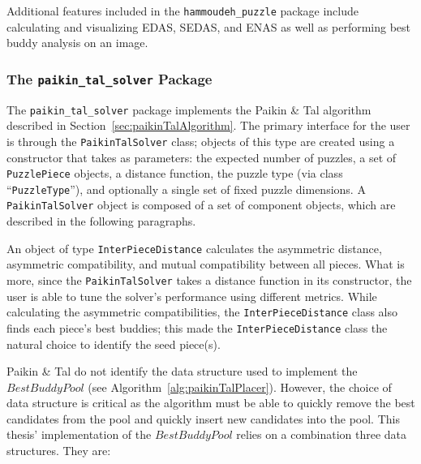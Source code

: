 \documentclass{report}
\newcommand{\hammoudehPuzzlePackage}{\texttt{hammoudeh\_puzzle} }
\newcommand{\paikinTalPackage}{\texttt{paikin\_tal\_solver} }
\begin{document}
Additional features included in the \hammoudehPuzzlePackage package include calculating and visualizing EDAS, SEDAS, and ENAS as well as performing best buddy analysis on an image.

\subsubsection{The \paikinTalPackage Package}\label{sec:paikinTalSolverPackage}

The \paikinTalPackage package implements the Paikin \& Tal algorithm described in Section~\ref{sec:paikinTalAlgorithm}.  The primary interface for the user is through the \texttt{PaikinTalSolver} class; objects of this type are created using a constructor that takes as parameters: the expected number of puzzles, a set of \texttt{PuzzlePiece} objects, a distance function, the puzzle type (via class ``\texttt{PuzzleType}''), and optionally a single set of fixed puzzle dimensions.  A \texttt{PaikinTalSolver} object is composed of a set of component objects, which are described in the following paragraphs.

An object of type \texttt{InterPieceDistance} calculates the asymmetric distance, asymmetric compatibility, and mutual compatibility between all pieces.  What is more, since the \texttt{PaikinTalSolver} takes a distance function in its constructor, the user is able to tune the solver's performance using different metrics.  While calculating the asymmetric compatibilities, the \texttt{InterPieceDistance} class also finds each piece's best buddies; this made the \texttt{InterPieceDistance} class the natural choice to identify the seed piece(s).

Paikin \& Tal do not identify the data structure used to implement the $BestBuddyPool$ (see Algorithm~\ref{alg:paikinTalPlacer}). However, the choice of data structure is critical as the algorithm must be able to quickly remove the best candidates from the pool and quickly insert new candidates into the pool.  This thesis' implementation of the $BestBuddyPool$ relies on a combination three data structures.  They are:
\end{document}
